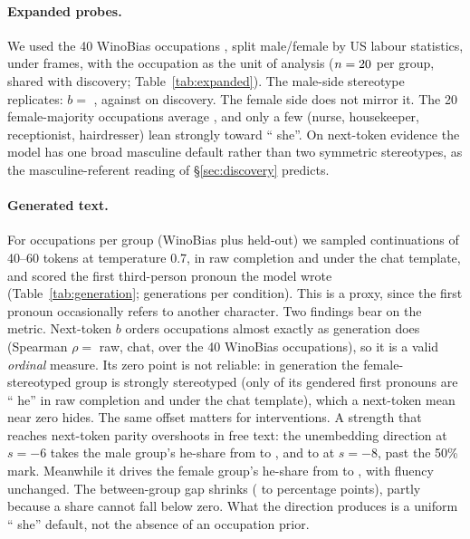 \documentclass{article}
\begin{document}
\paragraph{Expanded probes.} We used the 40 WinoBias occupations \citep{zhao2018}, split
male/female by US labour statistics, under \XFrames{} frames, with the occupation as the
unit of analysis ($n=20$ per group, \XOverlap{} shared with discovery;
Table~\ref{tab:expanded}). The male-side stereotype replicates: $b={}$\XBaseMale{}
\XBaseMaleCI{}, against \BaseMale{} on discovery. The female side does not mirror it. The
20 female-majority occupations average \XBaseFemale{} \XBaseFemaleCI{}, and only a few
(nurse, housekeeper, receptionist, hairdresser) lean strongly toward `` she''. On next-token
evidence the model has one broad masculine default rather than two symmetric stereotypes,
as the masculine-referent reading of \S\ref{sec:discovery} predicts.

\paragraph{Generated text.} For \GenNOcc{} occupations per group (WinoBias plus held-out)
we sampled continuations of 40--60 tokens at temperature 0.7, in raw completion and under
the chat template, and scored the first third-person pronoun the model wrote
(Table~\ref{tab:generation}; \GenNPerCond{} generations per condition). This is a proxy,
since the first pronoun occasionally refers to another character. Two findings bear on the
metric. Next-token $b$ orders occupations almost exactly as generation does (Spearman
$\rho={}$\ValidRawRho{} raw, \ValidChatRho{} chat, over the 40 WinoBias occupations), so it is
a valid \emph{ordinal} measure. Its zero point is not reliable: in generation the
female-stereotyped group is strongly stereotyped (only \GenRawFemBase{} of its gendered
first pronouns are `` he'' in raw completion and \GenChatFemBase{} under the chat
template), which a next-token mean near zero hides. The same offset matters for
interventions. A strength that reaches next-token parity overshoots in free text: the
unembedding direction at $s=-6$ takes the male group's he-share from \GenRawBase{} to
\GenRawUnembSix{}, and to \GenRawUnembEight{} at $s=-8$, past the 50\% mark. Meanwhile it
drives the female group's he-share from \GenRawFemBase{} to \GenRawFemUnembSix{},
with fluency unchanged. The between-group gap shrinks (\GenRawGapBase{} to
\GenRawGapUnembSix{} percentage points), partly because a share cannot fall below zero.
What the direction produces is a uniform `` she'' default, not the absence of an
occupation prior.
\end{document}
